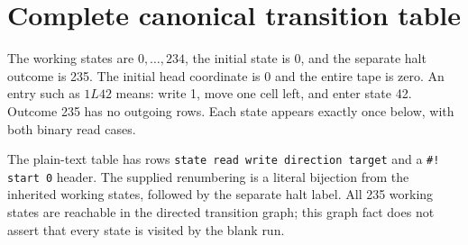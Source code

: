 \section{Complete canonical transition table}
\label{app:machine}
The working states are $0,\ldots,234$, the initial state is 0, and the
separate halt outcome is 235. The initial head coordinate is 0 and the
entire tape is zero. An entry such as $1L42$ means: write 1, move one cell
left, and enter state 42. Outcome 235 has no outgoing rows. Each state
appears exactly once below, with both binary read cases.

The plain-text table has rows \texttt{state read write direction target}
and a \texttt{\#! start 0} header. The supplied renumbering is a literal
bijection from the inherited working states, followed by the separate
halt label. All 235 working states are reachable in the directed
transition graph; this graph fact does not assert that every state is
visited by the blank run.

